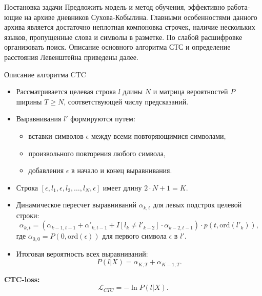 \documentclass{beamer}
\begin{document}
\begin{frame}{Постановка задачи}
Предложить модель и метод обучения, эффективно работа-
ющие на архиве дневников Сухова-Кобылина. Главными особенностями данного архива является
достаточно неплотная компоновка строчек, наличие нескольких языков, пропущенные слова и символы в разметке. По слабой расшифровке организовать поиск. Описание основного алгоритма СТС и определение расстояния Левенштейна приведены далее.
\end{frame}
\begin{frame}{Описание алгоритма CTC}

    \begin{itemize}
        \item Рассматривается целевая строка \( l \) длины \( N \) и матрица вероятностей \( P \) ширины \( T \geq N \), соответствующей числу предсказаний.
        \item Выравнивания \( l' \) формируются путем:
        \begin{itemize}
            \item вставки символов \( \epsilon \) между всеми повторяющимися символами,
            \item произвольного повторения любого символа,
            \item добавления \( \epsilon \) в начало и конец выравнивания.
        \end{itemize}
        \item Строка \( [\epsilon, l_1, \epsilon, l_2, \ldots, l_N, \epsilon] \) имеет длину \( 2 \cdot N + 1 = K \).
        \item Динамическое пересчет выравниваний \( \alpha_{k,t} \) для левых подстрок целевой строки:
        \[
        \alpha_{k,t} = (\alpha_{k-1,t-1} + \alpha'_{k,t-1} + I[l_k \neq l'_{k-2}] \cdot \alpha_{k-2,t-1}) \cdot p(t, \text{ord}(l'_k)),
        \]
        где \( \alpha_{0,0} = P(0, \text{ord}(\epsilon)) \) для первого символа \( \epsilon \) в \( l' \).
        \item Итоговая вероятность всех выравниваний:
        \[
        P(l|X) = \alpha_{K,T} + \alpha_{K-1,T}.
        \]
    \end{itemize}
    \textbf{CTC-loss:}
    \[
    \mathcal{L}_{CTC} = -\ln P(l|X).
    \]
\end{frame}
\end{document}
